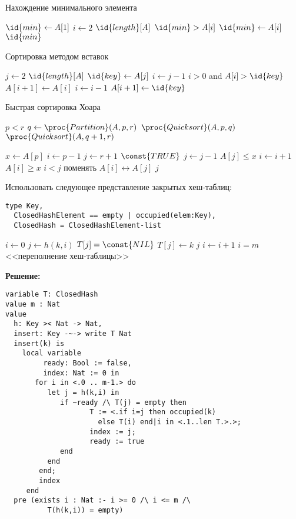 

\z Нахождение минимального элемента
\begin{codebox}
\li $\id{min} \gets A[1]$
\li \For $i \gets 2$ \To $\id{length}[A]$
\li \Do \If $\id{min} > A[i]$
\li \Then $\id{min} \gets A[i]$ \End \End
\li \Return $\id{min}$
\end{codebox}

\z Сортировка методом вставок
\begin{codebox}
\li \For $j \gets 2$ \To $\id{length}[A]$
\li \Do $\id{key} \gets A[j]$
\li $i \gets j-1$
\li \While $i > 0$ and $A[i] > \id{key}$
\li \Do $A[i+1] \gets A[i]$
\li $i \gets i-1$ \End
\li $A[i+1] \gets \id{key}$ \End
\end{codebox}

\z Быстрая сортировка Хоара
\begin{codebox}
\li \If $p < r$
\li \Then $q \gets \proc{Partition}(A, p, r)$
\li $\proc{Quicksort}(A, p, q)$
\li $\proc{Quicksort}(A, q+1, r)$ \End
\end{codebox}

\begin{codebox}
\li $x \gets A[p]$
\li $i \gets p-1$
\li $j \gets r+1$
\li \While $\const{TRUE}$
\li \Do \Repeat $j \gets j-1$
\li \Until $A[j] \leqslant x$
\li \Repeat $i \gets i+1$
\li \Until $A[i] \geqslant x$
\li \If $i < j$
\li \Then $\mbox{поменять~} A[i] \leftrightarrow A[j]$
\li \Else \Return $j$ \End \End
\end{codebox}

\z Использовать следующее представление закрытых хеш-таблиц:
\begin{lstlisting}
type Key,
  ClosedHashElement == empty | occupied(elem:Key),
  ClosedHash = ClosedHashElement-list
\end{lstlisting}

\begin{codebox}
\li $i \gets 0$
\li \Repeat $j \gets h(k,i)$
\li \If $T[j] = \const{NIL}$
\li \Then $T[j] \gets k$
\li \Return $j$
\li \Else $i \gets i+1$ \End
\li \Until $i = m$ \End
\li \Error <<переполнение хеш-таблицы>>
\end{codebox}

\textbf{Решение:}
\begin{lstlisting}
variable T: ClosedHash
value m : Nat
value
  h: Key >< Nat -> Nat,
  insert: Key -~-> write T Nat
  insert(k) is
    local variable
         ready: Bool := false,
         index: Nat := 0 in
       for i in <.0 .. m-1.> do
          let j = h(k,i) in
             if ~ready /\ T(j) = empty then
                    T := <.if i=j then occupied(k)
                      else T(i) end|i in <.1..len T.>.>;
                    index := j;
                    ready := true
             end
          end
        end;
        index
     end
  pre (exists i : Nat :- i >= 0 /\ i <= m /\
          T(h(k,i)) = empty)
\end{lstlisting}

